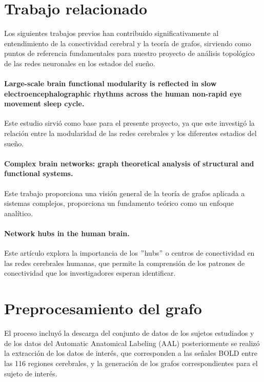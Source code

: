 \documentclass{article}
\begin{document}
\section{Trabajo relacionado}\label{sec:trabajo-relacionado}

Los siguientes trabajos previos han contribuido significativamente al entendimiento de la conectividad cerebral y la teoría de grafos, sirviendo como puntos de referencia fundamentales para nuestro proyecto de análisis topológico de las redes neuronales en los estados del sueño.

\paragraph{Large-scale brain functional modularity is reflected in slow electroencephalographic rhythms across the human non-rapid eye movement sleep cycle.}

Este estudio sirvió como base para el presente proyecto, ya que este investigó la relación entre la modularidad de las redes cerebrales y los diferentes estadios del sueño\cite{Tagliazucchi:2013aa}.

\paragraph{Complex brain networks: graph theoretical analysis of structural and functional systems.}

Este trabajo proporciona una visión general de la teoría de grafos aplicada a sistemas complejos, proporciona un fundamento teórico como un enfoque analítico\cite{Bullmore:2009aa}.

\paragraph{Network hubs in the human brain.}

Este artículo explora la importancia de los \("\)hubs\("\) o centros de conectividad en las redes cerebrales humanas, que permite la comprensión de los patrones de conectividad que los investigadores esperan identificar\cite{Heuvel:2013aa}.


\section{Preprocesamiento del grafo}\label{sec:preprocesamiento-del-grafo}

El proceso incluyó la descarga del conjunto de datos de los sujetos estudiados y de los datos del Automatic Anatomical Labeling (AAL)\cite{Tzourio-Mazoyer:2002aa} posteriormente se realizó la extracción de los datos de interés, que corresponden a las señales BOLD entre las 116 regiones cerebrales, y la generación de los grafos correspondientes para el sujeto de interés.
\end{document}
